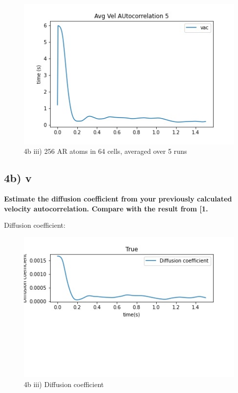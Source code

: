 \documentclass[a4paper,10pt,english]{article}
\begin{document}
\begin{figure}[h!]
        \centering 
        \includegraphics[scale=0.6]{./py/img/4biv_avg.jpg} 
        \caption{4b iii) 256 AR atoms in 64 cells, averaged over 5 runs}
        \label{fig:4biii}
\end{figure}




\subsection*{4b) v}
\textbf{Estimate the diffusion coefficient from your previously calculated velocity autocorrelation. Compare with the result from [1.}

Diffusion coefficient:

\begin{figure}[h!]
        \centering 
        \includegraphics[scale=0.6]{./py/img/4b_v.jpg} 
        \caption{4b iii) Diffusion coefficient}
        \label{fig:4bv}
\end{figure}
\end{document}
